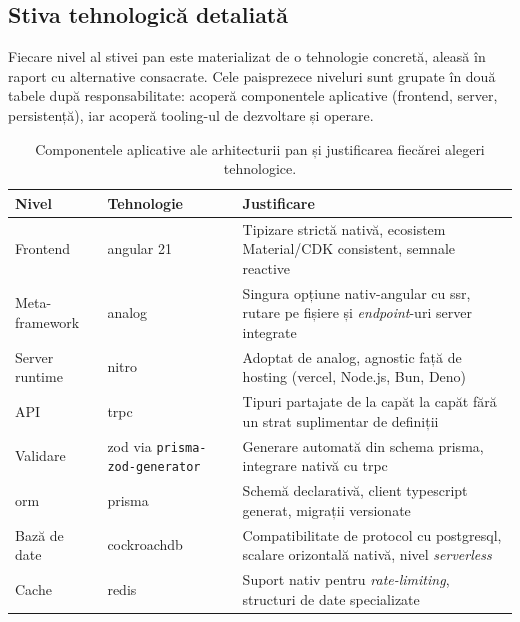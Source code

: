 \subsection{Stiva tehnologică detaliată}\label{subsec:pan-stiva}

Fiecare nivel al stivei \gls{pan} este materializat de o tehnologie concretă, aleasă în raport cu alternative consacrate.
Cele paisprezece niveluri sunt grupate în două tabele după responsabilitate:  acoperă componentele aplicative (frontend, server, persistență), iar  acoperă tooling-ul de dezvoltare și operare.

\begin{table}[htbp]
\centering
\caption{Componentele aplicative ale arhitecturii \gls{pan} și justificarea fiecărei alegeri tehnologice.}
\label{tab:pan-stiva}
\small
\begin{tabularx}{\textwidth}{llY}
\toprule
\textbf{Nivel} & \textbf{Tehnologie} & \textbf{Justificare} \\
\midrule
Frontend         & \gls{angular} 21                  & Tipizare strictă nativă, ecosistem Material/CDK consistent, semnale reactive \\
Meta-framework   & \gls{analog}                      & Singura opțiune nativ-\gls{angular} cu \acrshort{ssr}, rutare pe fișiere și \textit{endpoint}-uri server integrate \\
Server runtime   & \gls{nitro}                       & Adoptat de \gls{analog}, agnostic față de hosting (\gls{vercel}, Node.js, Bun, Deno) \\
API   & \gls{trpc}                        & Tipuri partajate de la capăt la capăt fără un strat suplimentar de definiții \\
Validare         & \gls{zod} via \texttt{prisma-zod-generator} & Generare automată din schema \gls{prisma}, integrare nativă cu \gls{trpc} \\
\gls{orm}        & \gls{prisma}                      & Schemă declarativă, client \gls{typescript} generat, migrații versionate \\
Bază de date     & \gls{cockroachdb}                 & Compatibilitate de protocol cu \gls{postgresql}, scalare orizontală nativă, nivel \textit{serverless} \\
Cache            & \gls{redis}                       & Suport nativ pentru \textit{rate-limiting}, structuri de date specializate \\
\bottomrule
\end{tabularx}
\end{table}

